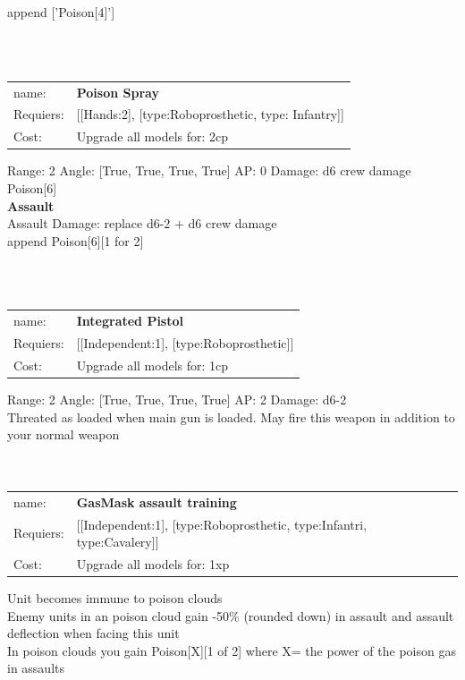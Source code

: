 {append ['Poison[4]']


\ \\
\ \\
\begin{tabular}{ll}
name: & {\bf Poison Spray } \\
Requiers: & [[Hands:2], [type:Roboprosthetic, type: Infantry]] \\
Cost: & Upgrade all models for: 2cp \\
\end{tabular}



Range: 2  Angle: [True, True, True, True] AP: 0 Damage: d6 crew damage \\
Poison[6]\\ 



{\bf Assault} \ \\
Assault Damage: replace d6-2 + d6 crew damage
\\ 

append Poison[6][1 for 2]


\ \\
\ \\
\begin{tabular}{ll}
name: & {\bf Integrated Pistol } \\
Requiers: & [[Independent:1], [type:Roboprosthetic]] \\
Cost: & Upgrade all models for: 1cp \\
\end{tabular}



Range: 2  Angle: [True, True, True, True] AP: 2 Damage: d6-2 \\
Threated as loaded when main gun is loaded. May fire this weapon in addition to your normal weapon\\ 








\ \\
\ \\
\begin{tabular}{ll}
name: & {\bf GasMask assault training } \\
Requiers: & [[Independent:1], [type:Roboprosthetic, type:Infantri, type:Cavalery]] \\
Cost: & Upgrade all models for: 1xp \\
\end{tabular}

Unit becomes immune to poison clouds\\ 
Enemy units in an poison cloud gain -50\% (rounded down) in assault and assault deflection when facing this unit\\ 
In poison clouds you gain Poison[X][1 of 2] where X= the power of the poison gas in assaults\\ 









}
